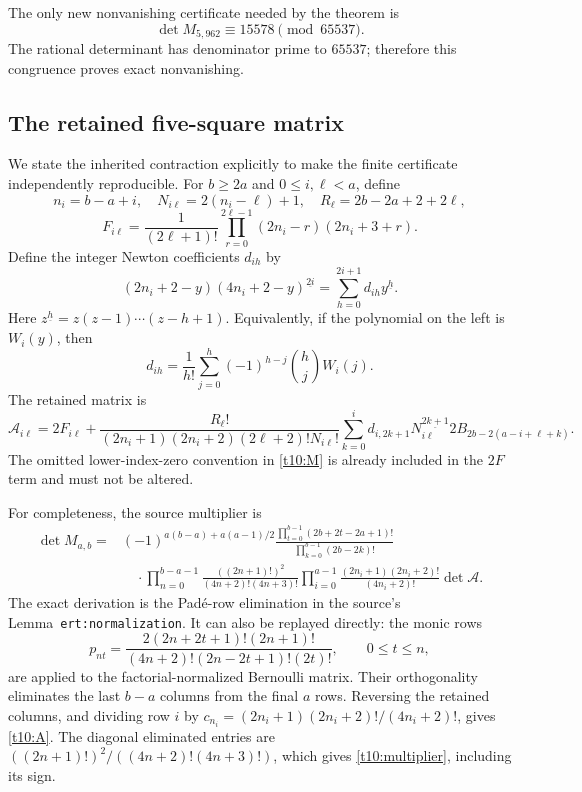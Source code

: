 \documentclass[11pt,letterpaper]{article}
\numberwithin{equation}{section}
\theoremstyle{definition}
\theoremstyle{remark}
\begin{document}
The only new nonvanishing certificate needed by the theorem is
\begin{equation}\label{t10:main-certificate}
 \boxed{\det M_{5,962}\equiv15578\pmod{65537}.}
\end{equation}
The rational determinant has denominator prime to $65537$;
therefore this congruence proves exact nonvanishing.

\subsection{The retained five-square matrix}

We state the inherited contraction explicitly to make the finite
certificate independently reproducible. For $b\ge2a$ and
$0\le i,\ell<a$, define
\[
 n_i=b-a+i,\quad N_{i\ell}=2(n_i-\ell)+1,\quad
 R_\ell=2b-2a+2+2\ell,
\]
\[
 F_{i\ell}=\frac1{(2\ell+1)!}
 \prod_{r=0}^{2\ell-1}(2n_i-r)(2n_i+3+r).
\]
Define the integer Newton coefficients $d_{ih}$ by
\begin{equation}\label{t10:Newton}
 (2n_i+2-y)(4n_i+2-y)^{\underline{2i}}
       =\sum_{h=0}^{2i+1}d_{ih}y^{\underline h}.
\end{equation}
Here $z^{\underline h}=z(z-1)\cdots(z-h+1)$. Equivalently,
if the polynomial on the left is $W_i(y)$, then
\[
 d_{ih}=\frac1{h!}\sum_{j=0}^h(-1)^{h-j}\binom hj W_i(j).
\]
The retained matrix is
\begin{equation}\label{t10:A}
 \mathcal A_{i\ell}=2F_{i\ell}
 +\frac{R_\ell!}
 {(2n_i+1)(2n_i+2)(2\ell+2)!N_{i\ell}!}
 \sum_{k=0}^i d_{i,2k+1}N_{i\ell}^{\underline{2k+1}}
                 2B_{2b-2(a-i+\ell+k)}.
\end{equation}
The omitted lower-index-zero convention in \eqref{t10:M} is
already included in the $2F$ term and must not be altered.

For completeness, the source multiplier is
\begin{equation}\label{t10:multiplier}
 \begin{aligned}
 \det M_{a,b}={}&(-1)^{a(b-a)+a(a-1)/2}
 \frac{\prod_{t=0}^{b-1}(2b+2t-2a+1)!}
      {\prod_{k=0}^{b-1}(2b-2k)!}\\
 &\quad\cdot\prod_{n=0}^{b-a-1}\frac{((2n+1)!)^2}{(4n+2)!(4n+3)!}
 \prod_{i=0}^{a-1}\frac{(2n_i+1)(2n_i+2)!}{(4n_i+2)!}
 \det\mathcal A.
 \end{aligned}
\end{equation}
The exact derivation is the Pad\'e-row elimination in the source's
Lemma~\texttt{ert:normalization}. It can also be replayed directly:
the monic rows
\[
 p_{nt}=\frac{2(2n+2t+1)!(2n+1)!}
 {(4n+2)!(2n-2t+1)!(2t)!},\qquad0\le t\le n,
\]
are applied to the factorial-normalized Bernoulli matrix. Their
orthogonality eliminates the last $b-a$ columns from the final $a$
rows. Reversing the retained columns, and dividing row $i$ by
$c_{n_i}=(2n_i+1)(2n_i+2)!/(4n_i+2)!$, gives \eqref{t10:A}.
The diagonal eliminated entries are
$((2n+1)!)^2/((4n+2)!(4n+3)!)$, which gives
\eqref{t10:multiplier}, including its sign.
\end{document}
